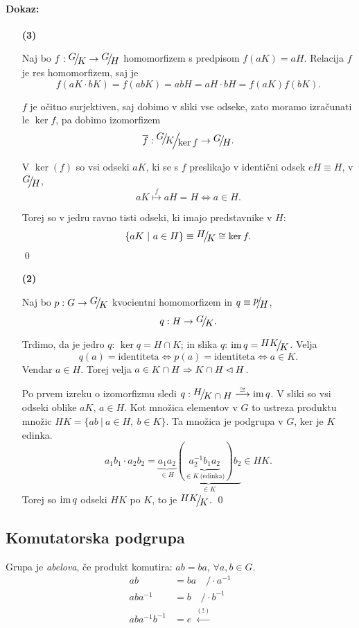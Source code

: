 \paragraph{Dokaz:}
\begin{itemize}
	\item[{\bf (3)}]{Naj bo $f : \quot{G}{K} \to \quot{G}{H}$ homomorfizem s predpisom $f (aK) = aH$. Relacija $f$ je res homomorfizem, saj je
		\[
			f (aK \cdot bK) = f (ab K) = ab H = aH \cdot bH = f (aK) f(bK).
		\]
		
		$f$ je o\v citno surjektiven, saj dobimo v sliki vse odseke, zato moramo izra\v cunati le $\ker f$, pa dobimo izomorfizem
		\[
			\f: \Qquot{G}{K}{\ker f} \to \quot{G}{H}.
		\]
			
		V $\ker (f)$ so vsi odseki $aK$, ki se s $f$ preslikajo v identi\v cni odsek $eH \equiv H$, v $\quot{G}{H}$,
		\[
			aK \stackrel{f}{\longmapsto} aH = H \iff a \in H.
		\]
		
		Torej so v jedru ravno tisti odseki, ki imajo predstavnike v $H$:
		\[
			\{aK\ |\ a\in H\} \equiv \quot{H}{K} \cong \ker f.
		\]
		\qed}
	\item[{\bf (2)}]{Naj bo $p : G \to \quot{G}{K}$ kvocientni homomorfizem in $q \equiv \quot{p}{H}$,
		\[
			q : H \to \quot{G}{K}.
		\]

		Trdimo, da je jedro $q$: $\ker q = H \cap K$; in slika $q$: $\im q = \quot{HK}{K}$. Velja
		\[
			q(a) = \text{identiteta} \iff p(a)= \text{identiteta} \iff a \in K.
		\] Vendar $a \in H$. Torej velja $a \in K\cap H \Rightarrow K\cap H \lhd H$.

		Po prvem izreku o izomorfizmu sledi $q : \quot{H}{K\cap H} \stackrel{\cong}{\longrightarrow} \im q$. V sliki so vsi odseki oblike $aK$, $a \in H$. Kot mno\v zica
		elementov v $G$ to ustreza produktu mno\v zic $HK = \{ab\ |\ a\in H,\ b\in K\}$. Ta mno\v zica je podgrupa v $G$, ker je $K$ edinka.
		\[
			a_1b_1 \cdot a_2 b_2  = \underbrace{a_1 a_2}_{\in H} \underbrace{(\underbrace{a_2^{-1} b_1 a_2}_{\in K\ \text{(edinka)}}) b_2}_{\in K} \in HK.
		\] Torej so $\operatorname{im} q$ odseki $HK$ po $K$, to je $\quot{HK}{K}$.
		\qed}
\end{itemize}

\subsection{Komutatorska podgrupa}

Grupa je \emph{abelova}, \v ce produkt komutira: $ab = ba$, $\forall a,b \in G$.
\begin{align*}
	ab &= ba \quad / \cdot a^{-1} \\
	aba^{-1} &= b \quad / \cdot b^{-1} \\
	aba^{-1}b^{-1} &= e \ \stackrel{(!)}{\longleftarrow}
\end{align*}

